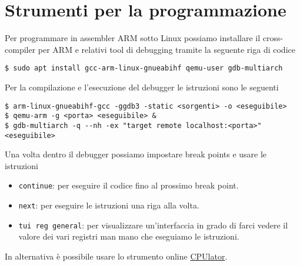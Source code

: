 \section{Strumenti per la programmazione}
Per programmare in assembler ARM sotto Linux possiamo installare il cross-compiler per ARM e
relativi tool di debugging tramite la seguente riga di codice
\begin{verbatim}
$ sudo apt install gcc-arm-linux-gnueabihf qemu-user gdb-multiarch
\end{verbatim}
Per la compilazione e l'esecuzione del debugger le istruzioni sono le seguenti
\begin{verbatim}
$ arm-linux-gnueabihf-gcc -ggdb3 -static <sorgenti> -o <eseguibile>
$ qemu-arm -g <porta> <eseguibile> &
$ gdb-multiarch -q --nh -ex "target remote localhost:<porta>" <eseguibile>
\end{verbatim}
Una volta dentro il debugger possiamo impostare break points e usare le istruzioni
\begin{itemize}
	\item \verb|continue|: per eseguire il codice fino al prossimo break point.
	\item \verb|next|: per eseguire le istruzioni una riga alla volta.
	\item \verb|tui reg general|: per visualizzare un'interfaccia in grado di farci vedere il
	      valore dei vari registri man mano che eseguiamo le istruzioni.
\end{itemize}
In alternativa è possibile usare lo strumento online \href{https://cpulator.01xz.net/}{CPUlator}.
